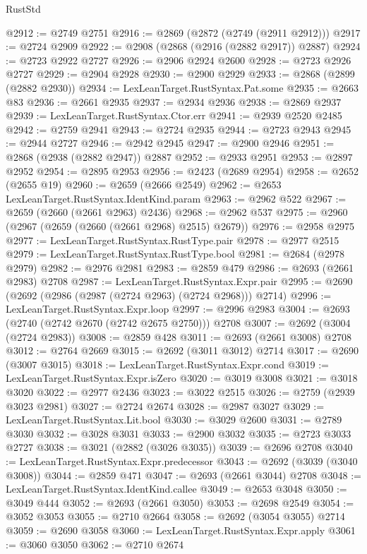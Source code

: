 \begin{lexlean}{RustStd}
\begin{coremodule}
{\begin{coremodule}
{{{{{{{{{{{{{{{{{{{{{{{{{{{{{{{{{{{{{{{@2912 := @2749 @2751
@2916 := @2869 (@2872 (@2749 (@2911 @2912)))
@2917 := @2724 @2909
@2922 := @2908 (@2868 (@2916 (@2882 @2917)) @2887)
@2924 := @2723 @2922 @2727
@2926 := @2906 @2924 @2600
@2928 := @2723 @2926 @2727
@2929 := @2904 @2928
@2930 := @2900 @2929
@2933 := @2868 (@2899 (@2882 @2930))
@2934 := LexLeanTarget.RustSyntax.Pat.some
@2935 := @2663 @83
@2936 := @2661 @2935
@2937 := @2934 @2936
@2938 := @2869 @2937
@2939 := LexLeanTarget.RustSyntax.Ctor.err
@2941 := @2939 @2520 @2485
@2942 := @2759 @2941
@2943 := @2724 @2935
@2944 := @2723 @2943
@2945 := @2944 @2727
@2946 := @2942 @2945
@2947 := @2900 @2946
@2951 := @2868 (@2938 (@2882 @2947)) @2887
@2952 := @2933 @2951
@2953 := @2897 @2952
@2954 := @2895 @2953
@2956 := @2423 (@2689 @2954)
@2958 := @2652 (@2655 @19)
@2960 := @2659 (@2666 @2549)
@2962 := @2653 LexLeanTarget.RustSyntax.IdentKind.param
@2963 := @2962 @522
@2967 := @2659 (@2660 (@2661 @2963) @2436)
@2968 := @2962 @537
@2975 := @2960 (@2967 (@2659 (@2660 (@2661 @2968) @2515) @2679))
@2976 := @2958 @2975
@2977 := LexLeanTarget.RustSyntax.RustType.pair
@2978 := @2977 @2515
@2979 := LexLeanTarget.RustSyntax.RustType.bool
@2981 := @2684 (@2978 @2979)
@2982 := @2976 @2981
@2983 := @2859 @479
@2986 := @2693 (@2661 @2983) @2708
@2987 := LexLeanTarget.RustSyntax.Expr.pair
@2995 := @2690 (@2692 (@2986 (@2987 (@2724 @2963) (@2724 @2968))) @2714)
@2996 := LexLeanTarget.RustSyntax.Expr.loop
@2997 := @2996 @2983
@3004 := @2693 (@2740 (@2742 @2670 (@2742 @2675 @2750))) @2708
@3007 := @2692 (@3004 (@2724 @2983))
@3008 := @2859 @428
@3011 := @2693 (@2661 @3008) @2708
@3012 := @2764 @2669
@3015 := @2692 (@3011 @3012) @2714
@3017 := @2690 (@3007 @3015)
@3018 := LexLeanTarget.RustSyntax.Expr.cond
@3019 := LexLeanTarget.RustSyntax.Expr.isZero
@3020 := @3019 @3008
@3021 := @3018 @3020
@3022 := @2977 @2436
@3023 := @3022 @2515
@3026 := @2759 (@2939 @3023 @2981)
@3027 := @2724 @2674
@3028 := @2987 @3027
@3029 := LexLeanTarget.RustSyntax.Lit.bool
@3030 := @3029 @2600
@3031 := @2789 @3030
@3032 := @3028 @3031
@3033 := @2900 @3032
@3035 := @2723 @3033 @2727
@3038 := @3021 (@2882 (@3026 @3035))
@3039 := @2696 @2708
@3040 := LexLeanTarget.RustSyntax.Expr.predecessor
@3043 := @2692 (@3039 (@3040 @3008))
@3044 := @2859 @471
@3047 := @2693 (@2661 @3044) @2708
@3048 := LexLeanTarget.RustSyntax.IdentKind.callee
@3049 := @2653 @3048
@3050 := @3049 @444
@3052 := @2693 (@2661 @3050)
@3053 := @2698 @2549
@3054 := @3052 @3053
@3055 := @2710 @2664
@3058 := @2692 (@3054 @3055) @2714
@3059 := @2690 @3058
@3060 := LexLeanTarget.RustSyntax.Expr.apply
@3061 := @3060 @3050
@3062 := @2710 @2674
}}}}}}}}}}}}}}}}}}}}}}}}}}}}}}}}}}}}}}}
\end{coremodule}}
\end{coremodule}
\end{lexlean}
